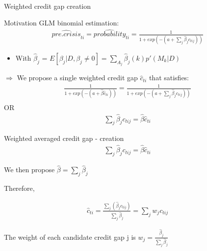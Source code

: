 \documentclass[
  ignorenonframetext,
]{beamer}
\providecommand{\tightlist}{%
  \setlength{\itemsep}{0pt}\setlength{\parskip}{0pt}}
\begin{document}
\begin{frame}{Weighted credit gap creation}
\protect\hypertarget{weighted-credit-gap-creation}{}
\begin{block}{Motivation}
\protect\hypertarget{motivation-3}{}
GLM binomial estimation: \begin{align*}
\widehat{pre.crisis}_{ti} = \widehat{probability}_{ti} = \frac {1}{1+exp(-(a+\sum\nolimits_j \hat{\beta}_j c_{tij}))}
\end{align*}

\begin{itemize}
\tightlist
\item
  With \(\hat{\beta}_j\) =
  \(E[\beta_j|D, \beta_j\ne 0] = \sum\limits_{A_j} \hat{\beta}_j(k)p'(M_k|D)\)
\end{itemize}

\(\Rightarrow\) We propose a single weighted credit gap \(\hat{c}_{ti}\)
that satisfies: \begin{align*}
\frac {1}{1+exp(-(a+\hat{\beta} \hat{c}_{ti}))}= \frac {1}{1+exp(-(a+\sum\nolimits_j \hat{\beta}_j c_{tij}))} \\
\end{align*} OR \begin{align}
\sum\limits_j \hat{\beta}_j c_{tij} = \hat{\beta} \hat{c}_{ti}
\end{align}
\end{block}
\end{frame}

\begin{frame}{Weighted averaged credit gap - creation}
\protect\hypertarget{weighted-averaged-credit-gap---creation}{}
\begin{align*}
\sum\limits_j \hat{\beta}_j c_{tij} = \hat{\beta} \hat{c}_{ti}
\end{align*}

We then propose \(\hat{\beta} = \sum\nolimits_j \hat{\beta}_j\)

Therefore,

\begin{align}
\hat{c}_{ti} = \frac{\sum\nolimits_j (\hat{\beta}_j c_{tij})}{\sum\nolimits_j\hat{\beta}_j} = \sum\nolimits_j w_j c_{tij}
\end{align}

The weight of each candidate credit gap j is
\(w_j = \frac{\hat{\beta}_j}{\sum\nolimits_j\hat{\beta}_j}\)
\end{frame}
\end{document}
